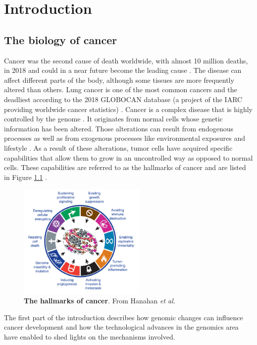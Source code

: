 
\chapter{Introduction} %


\vspace{-1cm}
\section{The biology of cancer}

\label{Intro-biology} 
Cancer was the second cause of death worldwide, with almost 10 million deaths, in 2018 \cite{Bray2018} and could in a near future become the leading cause \cite{Dagenais2020}. The disease can affect different parts of the body, although some tissues are more frequently altered than others.  Lung cancer is one of the most common cancers and the deadliest according to the 2018 GLOBOCAN database (a project of the \gls{IARC} providing worldwide cancer statistics)  \cite{Bray2018}. Cancer is a complex disease that is highly controlled by the genome \cite{Stratton2009,Wishart2015}. It originates from normal cells whose genetic information has been altered. Those alterations can result from endogenous processes as well as from exogenous processes like environmental exposures and lifestyle \cite{Eggert2011,Luch2005}. As a result of these alterations, tumor cells have acquired specific capabilities that allow them to grow in an uncontrolled way as opposed to normal cells. These capabilities are referred to as the hallmarks of cancer and are listed in Figure \ref{fig:intro_hallmarks} \cite{Hanahan2011}.
\begin{figure}[H]
    \centering
    \includegraphics[width=0.55\textwidth]{Figures/Intro/hallmarks.pdf}
    \caption[The hallmarks of cancer]{\textbf{The hallmarks of cancer}. From Hanahan \textit{et al.} \cite{Hanahan2011}}
    \label{fig:intro_hallmarks}
\end{figure}
The first part of the introduction describes how genomic changes can influence cancer development and how the technological advances in the genomics area have enabled to shed lights on the mechanisms involved. 

